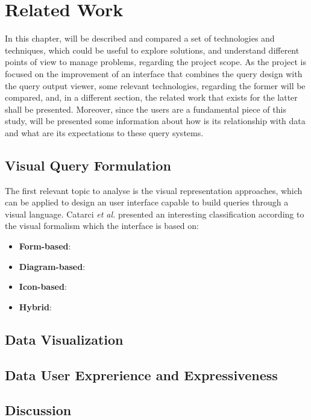 \chapter{Related Work}
\label{cha:related_work}
In this chapter, will be described and compared a set of technologies and techniques, which could be useful to explore solutions, and understand different points of view to manage problems, regarding the project scope. As the project is focused on the improvement of an interface that combines the query design with the query output viewer, some relevant technologies, regarding the former will be compared, and, in a different section, the related work that exists for the latter shall be presented. Moreover, since the users are a fundamental piece of this study, will be presented some information about how is its relationship with data and what are its expectations to these query systems.

\section{Visual Query Formulation}
\label{sec:visual_query_formulation}

The first relevant topic to analyse is the visual representation approaches, which can be applied to design an user interface capable to build queries through a visual language. Catarci \textit{et al.} \cite{visualQuerySystemsForDatabases_aSurvey} presented an interesting classification according to the visual formalism which the interface is based on:

\begin{itemize}
    \item \textbf{Form-based}: 
    \item \textbf{Diagram-based}: 
    \item \textbf{Icon-based}: 
    \item \textbf{Hybrid}: 
\end{itemize}

\section{Data Visualization}
\label{sec:data_visualization}

\section{Data User Exprerience and Expressiveness}
\label{sec:data_user_experience_and_expressiveness}

\section{Discussion}
\label{sec:discussion}